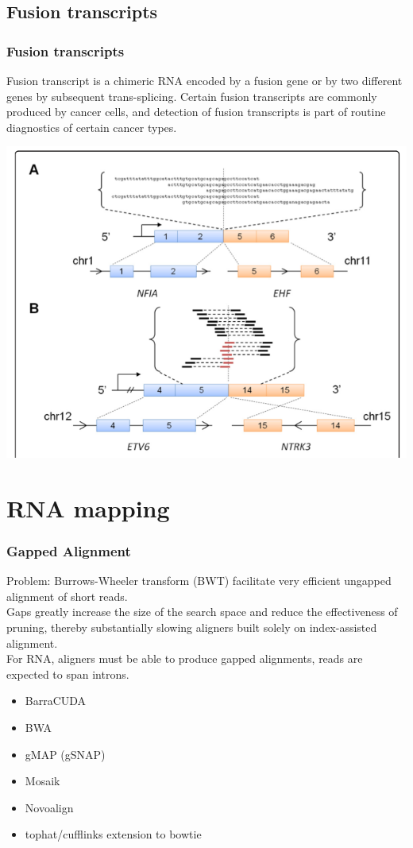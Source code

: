 \documentclass[pdf]{beamer}
\begin{document}
\subsection{Fusion transcripts}
\begin{frame}
  \frametitle{Fusion transcripts}
  Fusion transcript is a chimeric RNA encoded by a fusion gene or by two different genes by subsequent trans-splicing. Certain fusion transcripts are commonly produced by cancer cells, and detection of fusion transcripts is part of routine diagnostics of certain cancer types.
  \begin{center}
  \includegraphics[scale=0.22]{Figures/fusion.png} 
  \end{center}
\end{frame}

\section{RNA mapping}
\begin{frame}
  \frametitle{Gapped Alignment}
  Problem: Burrows-Wheeler transform (BWT) facilitate very efficient ungapped alignment of short reads.\\
   Gaps greatly increase the size of the search space and reduce the effectiveness of pruning, thereby substantially slowing aligners built solely on index-assisted alignment.\\
\vspace{0.2in}
  For RNA, aligners must be able to produce gapped alignments, reads are expected to span introns.
  \begin{itemize}
  \item BarraCUDA
  \item BWA
  \item gMAP (gSNAP)
  \item Mosaik
  \item Novoalign
  \item tophat/cufflinks extension to bowtie
  \end{itemize}
  
\end{frame}
\end{document}

